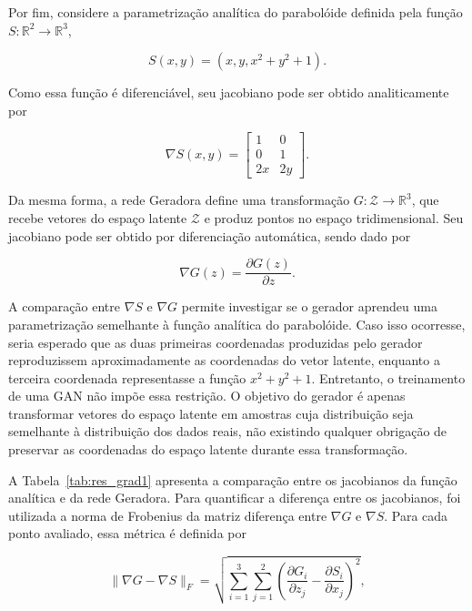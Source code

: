 \documentclass[10pt,a4paper]{article}
\begin{document}
Por fim, considere a parametrização analítica do parabolóide definida pela função
$S:\mathbb{R}^{2}\rightarrow\mathbb{R}^{3}$,

\begin{equation}
S(x,y)=\left(x,y,x^{2}+y^{2}+1\right).
\end{equation}

Como essa função é diferenciável, seu jacobiano pode ser obtido analiticamente por

\begin{equation}
\nabla S(x,y)=
\begin{bmatrix}
1 & 0\\
0 & 1\\
2x & 2y
\end{bmatrix}.
\label{eq:jacobian_s}
\end{equation}

Da mesma forma, a rede Geradora define uma transformação
$G:\mathcal{Z}\rightarrow\mathbb{R}^{3}$, que recebe vetores do espaço latente
$\mathcal{Z}$ e produz pontos no espaço tridimensional. Seu jacobiano pode ser obtido por diferenciação automática, sendo dado por

\begin{equation}
\nabla G(z)=
\frac{\partial G(z)}{\partial z}.
\label{eq:jacobian_g}
\end{equation}

A comparação entre $\nabla S$ e $\nabla G$ permite investigar se o gerador aprendeu uma parametrização semelhante à função analítica do parabolóide. Caso isso ocorresse, seria esperado que as duas primeiras coordenadas produzidas pelo gerador reproduzissem aproximadamente as coordenadas do vetor latente, enquanto a terceira coordenada representasse a função $x^{2}+y^{2}+1$. Entretanto, o treinamento de uma GAN não impõe essa restrição. O objetivo do gerador é apenas transformar vetores do espaço latente em amostras cuja distribuição seja semelhante à distribuição dos dados reais, não existindo qualquer obrigação de preservar as coordenadas do espaço latente durante essa transformação.

A Tabela~\ref{tab:res_grad1} apresenta a comparação entre os jacobianos da função analítica e da rede Geradora. Para quantificar a diferença entre os jacobianos, foi utilizada a norma de Frobenius da matriz diferença entre $\nabla G$ e $\nabla S$. Para cada ponto avaliado, essa métrica é definida por

\begin{equation}
\|\nabla G - \nabla S\|_F
=
\sqrt{
\sum_{i=1}^{3}
\sum_{j=1}^{2}
\left(
\frac{\partial G_i}{\partial z_j}
-
\frac{\partial S_i}{\partial x_j}
\right)^2
},
\label{eq:frobenius}
\end{equation}
\end{document}
